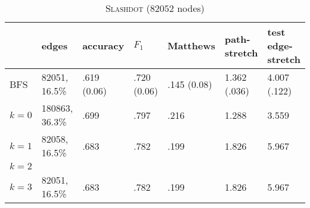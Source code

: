 \documentclass[a4paper,final,notitlepage,11pt,svgnames]{scrartcl}
\begin{document}
\begin{table}[htpb]
	\centering
	\caption{\textsc{Slashdot} ($82052$ nodes) \label{tab:slash}}
	\begin{tabular}{lllllll}
		\toprule
			& edges          & accuracy     & $F_1$        & Matthews     & path-stretch & test edge-stretch \\
		\midrule
		BFS      & 82051, 16.5\%  & .619 (0.06) & .720 (0.06) & .145 (0.08) & 1.362 (.036) & 4.007 (.122)\\
		$k=0$    & 180863, 36.3\% & .699         & .797         & .216         & 1.288        & 3.559 \\
		$k=1$    & 82058, 16.5\%  & .683         & .782         & .199         & 1.826        & 5.967 \\
		$k=2$    &                &              &              &              &              & \\
		$k=3$    & 82051, 16.5\%  & .683         & .782         & .199         & 1.826        & 5.967 \\
		\bottomrule
	\end{tabular}
\end{table}
\end{document}
